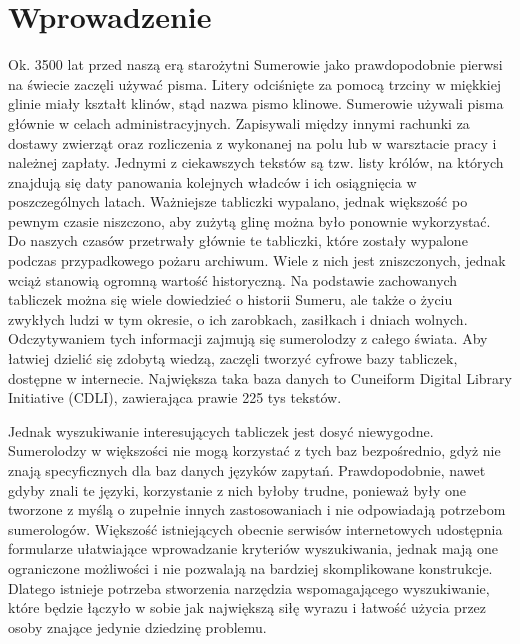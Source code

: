 \chapter*{Wprowadzenie}


Ok. 3500 lat przed naszą erą starożytni Sumerowie jako prawdopodobnie pierwsi na świecie zaczęli używać pisma. Litery odciśnięte za pomocą trzciny w miękkiej glinie miały kształt klinów, stąd nazwa pismo klinowe. Sumerowie używali pisma głównie w celach administracyjnych. Zapisywali między innymi rachunki za dostawy zwierząt oraz rozliczenia z wykonanej na polu lub w warsztacie pracy i należnej zapłaty. Jednymi z ciekawszych tekstów są tzw. listy królów, na których znajdują się daty panowania kolejnych władców i ich osiągnięcia w poszczególnych latach. Ważniejsze tabliczki wypalano, jednak większość po pewnym czasie niszczono, aby zużytą glinę można było ponownie wykorzystać. Do naszych czasów przetrwały głównie te tabliczki, które zostały wypalone podczas przypadkowego pożaru archiwum. Wiele z nich jest zniszczonych, jednak wciąż stanowią ogromną wartość historyczną. 
Na podstawie zachowanych tabliczek można się wiele dowiedzieć o historii Sumeru, ale także o życiu zwykłych ludzi w tym okresie, o ich zarobkach, zasiłkach i dniach wolnych. Odczytywaniem tych informacji zajmują się sumerolodzy z całego świata. Aby łatwiej dzielić się zdobytą wiedzą, zaczęli tworzyć cyfrowe bazy tabliczek, dostępne w internecie. Największa taka baza danych to Cuneiform Digital Library Initiative (CDLI), zawierająca prawie 225 tys tekstów.

Jednak wyszukiwanie interesujących tabliczek jest dosyć niewygodne. Sumerolodzy w większości nie mogą korzystać z tych baz bezpośrednio, gdyż nie znają specyficznych dla baz danych języków zapytań. Prawdopodobnie, nawet gdyby znali te języki, korzystanie z nich byłoby trudne, ponieważ były one tworzone z myślą o zupełnie innych zastosowaniach i nie odpowiadają potrzebom sumerologów. 
Większość istniejących obecnie serwisów internetowych udostępnia formularze ułatwiające wprowadzanie kryteriów wyszukiwania, jednak mają one ograniczone możliwości i nie pozwalają na bardziej skomplikowane konstrukcje. Dlatego istnieje potrzeba stworzenia narzędzia wspomagającego wyszukiwanie, które będzie łączyło w sobie jak największą siłę wyrazu i łatwość użycia przez osoby znające jedynie dziedzinę problemu.

